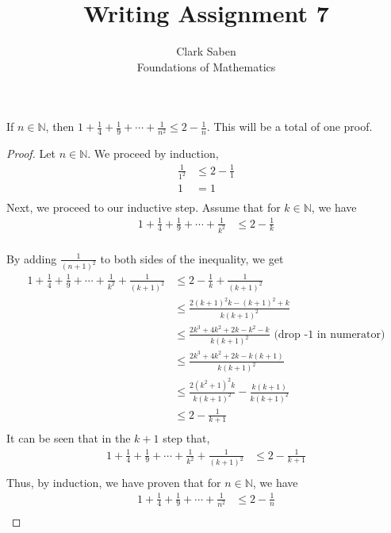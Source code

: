 \documentclass[12pt]{article}
\newenvironment{theorem}[2][Theorem]{\begin{trivlist}
\item[\hskip \labelsep {\bfseries #1}\hskip \labelsep {\bfseries #2.}]}{\end{trivlist}}
\begin{document}
 
 
\title{Writing Assignment 7}%
\author{Clark Saben\\ %
Foundations of Mathematics} %
 
\maketitle
 
\begin{theorem}{WA 7.1}
	If $n \in \mathbb{N}$, then $1+\frac{1}{4}+\frac{1}{9}+\cdots+\frac{1}{n^2} \leq 2-\frac{1}{n}$. This will be a total of one proof.
\end{theorem}
\begin{proof}
	Let $n \in \mathbb{N}$. We proceed by induction,
	$$
	\begin{aligned}
		\frac{1}{1^2} &\leq 2-\frac{1}{1}\\
		1 &=1\\
	\end{aligned}
	$$
	Next, we proceed to our inductive step. Assume that for $k \in \mathbb{N}$, we have
	$$
	\begin{aligned}
		1+\frac{1}{4}+\frac{1}{9}+\cdots+\frac{1}{k^2} &\leq 2-\frac{1}{k}\\
	\end{aligned}
	$$

	By adding $\frac{1}{(n+1)^2}$ to both sides of the inequality, we get
	$$
	\begin{aligned}
		1+\frac{1}{4}+\frac{1}{9}+\cdots+\frac{1}{k^2}+\frac{1}{(k+1)^2} &\leq 2-\frac{1}{k}+\frac{1}{(k+1)^2}\\
										 &\leq \frac{2(k+1)^2k - (k+1)^2 + k}{k(k+1)^2}\\
										 &\leq \frac{2k^3+4k^2+2k-k^2-k}{k(k+1)^2}    \text{   (drop -1 in numerator)}\\
										 &\leq \frac{2k^3+4k^2+2k-k(k+1)}{k(k+1)^2}\\
										 &\leq \frac{2(k^2+1)^2k}{k(k+1)^2} - \frac{k(k+1)}{k(k+1)^2}\\
										 &\leq 2 - \frac{1}{k+1}\\
	\end{aligned}
	$$
	It can be seen that in the $k+1$ step that,
	$$
	\begin{aligned}
		1+\frac{1}{4}+\frac{1}{9}+\cdots+\frac{1}{k^2}+\frac{1}{(k+1)^2} &\leq 2-\frac{1}{k+1}\\
	\end{aligned}
	$$
	Thus, by induction, we have proven that for $n \in \mathbb{N}$, we have
	$$
	\begin{aligned}
		1+\frac{1}{4}+\frac{1}{9}+\cdots+\frac{1}{n^2} &\leq 2-\frac{1}{n}\\
	\end{aligned}
	$$




\end{proof}

 

    



 
 
\end{document}
